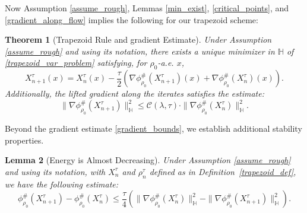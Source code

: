 \documentclass[11pt,a4paper]{amsart}
\newcommand{\1}{\mathds{1}}
\newtheorem{theorem}{\textbf{Theorem}}[section]
\newtheorem{lemma}[theorem]{\textbf{Lemma}}
\numberwithin{equation}{section}
\begin{document}
\noindent Now Assumption \ref{assume_rough}, Lemmas   \ref{min_exist}, \ref{critical_points}, and \ref{gradient_along_flow} implies the following for our trapezoid scheme:


\begin{theorem}[Trapezoid Rule and gradient Estimate] \label{trapezoid_well_defined} 
Under Assumption \ref{assume_rough} and using its notation, there exists a unique minimizer in $\mathbb{H}$ of \eqref{trapezoid_var_problem} satisfying, for $\rho_0$-a.e. $x$,
\begin{equation}
    X^{\tau}_{n+1}(x) = X^{\tau}_{n}(x) - \frac{\tau}{2} \left( \nabla \phi^{\#}_{\rho_0}(X^{\tau}_{n+1})(x) + \nabla \phi^{\#}_{\rho_0}(X^{\tau}_n)(x) \right).
    \label{trapezoid_implicit}
\end{equation}
Additionally, the lifted gradient along the iterates satisfies the estimate:
\begin{equation}
    \|\nabla \phi^{\#}_{\rho_0}(X_{n+1}^{\tau})\|^2_{\mathbb{H}} 
    \leq \mathcal{C}(\lambda,\tau) \cdot \|\nabla \phi^{\#}_{\rho_0}(X^{\tau}_n)\|^2_{\mathbb{H}}.
    \label{gradient_bounds}
\end{equation}
\end{theorem}



Beyond the gradient estimate \eqref{gradient_bounds}, we establish additional stability properties.

\begin{lemma}[Energy is Almost Decreasing] \label{energy_almost_decreasing}
Under Assumption \ref{assume_rough} and using its notation, with $X_n^\tau$ and $\rho_n^\tau$ defined as in Definition~\ref{trapezoid_def}, we have the following estimate:
\begin{equation}
    \phi^{\#}_{\rho_0}(X^{\tau}_{n+1}) - \phi^{\#}_{\rho_0}(X^{\tau}_{n})
    \leq \frac{\tau}{4} \left( \|\nabla \phi^{\#}_{\rho_0}(X_n^\tau)\|^2_{\mathbb{H}} 
    - \|\nabla \phi^{\#}_{\rho_0}(X_{n+1}^\tau)\|^2_{\mathbb{H}} \right).
    \label{one_step_almost_decrease}
\end{equation}
\end{lemma}
\end{document}
